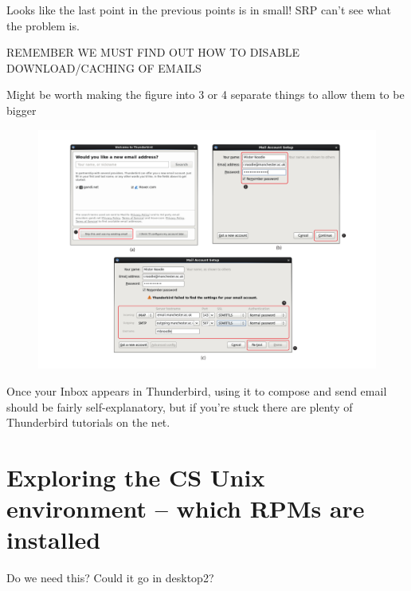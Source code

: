 \begin{note}
Looks like the last point in the previous points is in small! SRP can't see what the problem is.
\end{note}

\begin{note}
REMEMBER WE MUST FIND OUT HOW TO DISABLE DOWNLOAD/CACHING OF EMAILS
\end{note}

\begin{note}
Might be worth making the figure into 3 or 4 separate things to allow them to be bigger
\end{note}

\begin{figure}[h]
\centerline{\includegraphics[width=17cm]{images/thunderbird-instructions}}
\caption{}\label{figure:thunderbird}
\end{figure}

Once your Inbox appears in Thunderbird, using it to compose and send email should be fairly self-explanatory, but if you're stuck there are plenty of Thunderbird tutorials on the net. 


\section{Exploring the CS Unix environment -- which RPMs are installed}

\begin{note}
  Do we need this? Could it go in desktop2?
\end{note}



